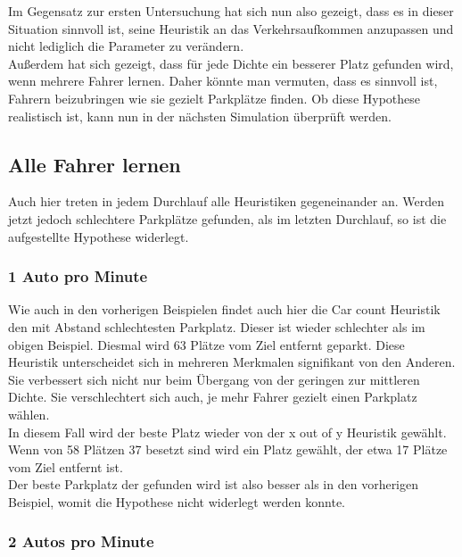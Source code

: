   Im Gegensatz zur ersten Untersuchung hat sich nun also gezeigt, dass es in dieser Situation sinnvoll ist, seine Heuristik an das Verkehrsaufkommen anzupassen und nicht lediglich die Parameter zu verändern.\\
  Außerdem hat sich gezeigt, dass für jede Dichte ein besserer Platz gefunden wird, wenn mehrere Fahrer lernen. Daher könnte man vermuten, dass es sinnvoll ist, Fahrern beizubringen wie sie gezielt Parkplätze finden. Ob diese Hypothese realistisch ist, kann nun in der nächsten Simulation überprüft werden. 
  
  \subsection{Alle Fahrer lernen}
  
Auch hier treten in jedem Durchlauf alle Heuristiken gegeneinander an. Werden jetzt jedoch schlechtere Parkplätze gefunden, als im letzten Durchlauf, so ist die aufgestellte Hypothese widerlegt.

  \subsubsection{1 Auto pro Minute}
  
Wie auch in den vorherigen Beispielen findet auch hier die Car count Heuristik den mit Abstand schlechtesten Parkplatz. 
Dieser ist wieder schlechter als im obigen Beispiel. Diesmal wird 63 Plätze vom Ziel entfernt geparkt. Diese Heuristik unterscheidet sich in mehreren Merkmalen signifikant von den Anderen. Sie verbessert sich nicht nur beim Übergang von der geringen zur mittleren Dichte. Sie verschlechtert sich auch, je mehr Fahrer gezielt einen Parkplatz wählen.\\
In diesem Fall wird der beste Platz wieder von der x out of y Heuristik gewählt. 
Wenn von 58 Plätzen 37 besetzt sind wird ein Platz gewählt, der etwa 17 Plätze vom Ziel entfernt ist. \\
Der beste Parkplatz der gefunden wird ist also besser als in den vorherigen Beispiel, womit die Hypothese nicht widerlegt werden konnte.\\

\subsubsection{2 Autos pro Minute}


